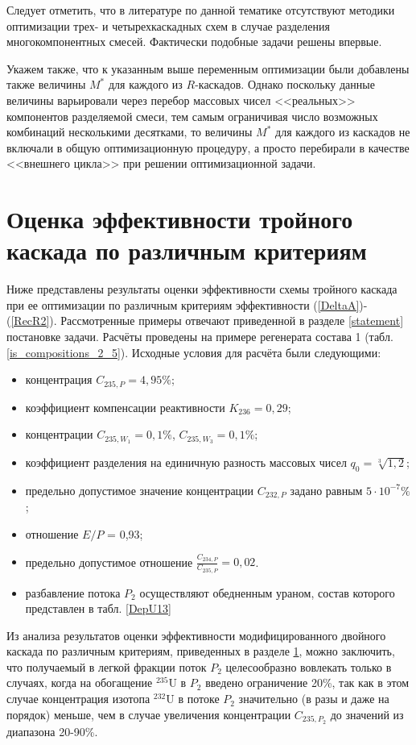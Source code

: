 Следует отметить, что в литературе по данной тематике отсутствуют методики оптимизации трех- и четырехкаскадных схем в случае разделения многокомпонентных смесей. Фактически подобные задачи решены впервые.

Укажем также, что к указанным выше переменным оптимизации были добавлены также величины $M^{*}$ для каждого из $R$-каскадов. Однако поскольку данные величины варьировали через перебор массовых чисел <<реальных>> компонентов разделяемой смеси, тем самым ограничивая число возможных комбинаций несколькими десятками, то величины  $M^{*}$ для каждого из каскадов не включали в общую оптимизационную процедуру, а просто перебирали в качестве <<внешнего цикла>> при решении оптимизационной задачи.

\section{Оценка эффективности тройного каскада по различным критериям}\label{MDKefficiency}

Ниже представлены результаты оценки эффективности схемы тройного каскада при ее оптимизации по различным критериям эффективности (\ref{DeltaA})-(\ref{RecR2}). Рассмотренные примеры отвечают приведенной в разделе \ref{statement} постановке задачи. Расчёты проведены на примере регенерата состава 1  (табл. \ref{is_compositions_2_5}). Исходные условия для расчёта были следующими:

\begin{itemize}
    \item концентрация $C_{235,{P}} = {4,95\%}$; 
    \item коэффициент компенсации реактивности $K_{236}=0,29$;
    \item концентрации $C_{235,{W_1}} = 0,1\%$, $C_{235,{W_3}} = 0,1\%$;
    \item коэффициент разделения на единичную разность массовых чисел $q_{0} = \sqrt[3]{1,2}$;
    \item предельно допустимое значение концентрации $C_{232,{P}}$ задано равным $5\cdot10^{-7} \%$;
    \item отношение $E/P$ = 0,93;
    \item предельно допустимое отношение $\frac{C_{234,{P}}}{C_{235,{P}}} = 0,02$.
    \item разбавление потока $P_2$ осуществляют обедненным ураном, состав которого представлен в табл. \ref{DepU13}
\end{itemize}

Из анализа результатов оценки эффективности модифицированного двойного каскада по различным критериям, приведенных в разделе \ref{MDKefficiency}, можно заключить, что получаемый в легкой фракции поток $P_2$ целесообразно вовлекать только в случаях, когда на обогащение $^{235}$U в $P_2$ введено ограничение 20\%, так как в этом случае концентрация изотопа $^{232}$U в потоке $P_2$ значительно (в разы и даже на порядок) меньше, чем в случае увеличения концентрации $C_{235,{P_2}}$ до значений из диапазона 20-90\%.

